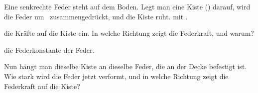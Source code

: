 Eine senkrechte Feder steht auf dem Boden. Legt man eine Kiste (\mKO) darauf, wird die Feder um \dxO\ zusammengedrückt, und die Kiste ruht.  mit \gO.

\begin{center}
\end{center}

\begin{abcliste}
\abc
{} die Kräfte auf die Kiste ein. In welche Richtung zeigt die Federkraft, und warum?

\abc
{} die Federkonstante der Feder.

\abc
Nun hängt man dieselbe Kiste an dieselbe Feder, die an der Decke befestigt ist. Wie stark wird die Feder jetzt verformt, und in welche Richtung zeigt die Federkraft auf die Kiste?
\end{abcliste}
